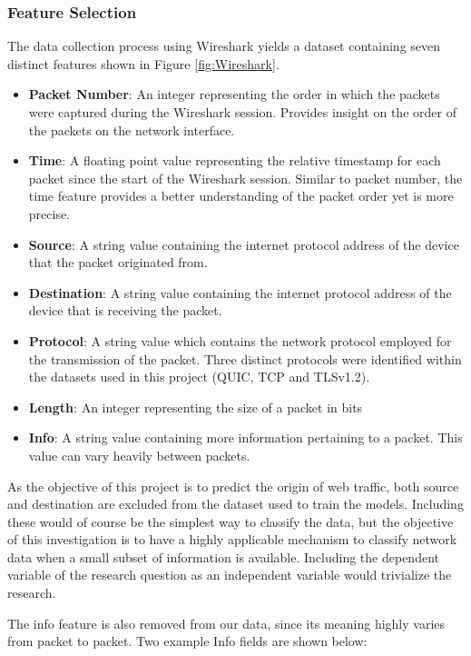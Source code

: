 \documentclass[10pt,sigconf,letterpaper,nonacm]{acmart}
\begin{document}
\subsubsection{Feature Selection}
The data collection process using Wireshark yields a dataset containing seven distinct features shown in Figure \ref{fig:Wireshark}. 
\begin{itemize}
  \item \textbf{Packet Number}: An integer representing the order in which the packets were captured during the Wireshark session. Provides insight on the order of the packets on the network interface. 
  \item \textbf{Time}: A floating point value representing the relative timestamp for each packet since the start of the Wireshark session. Similar to packet number, the time feature provides a better understanding of the packet order yet is more precise.
  \item \textbf{Source}: A string value containing the internet protocol address of the device that the packet originated from. 
  \item \textbf{Destination}: A string value containing the internet protocol address of the device that is receiving the packet. 
  \item \textbf{Protocol}: A string value which contains the network protocol employed for the transmission of the packet. Three distinct protocols were identified within the datasets used in this project (QUIC, TCP and TLSv1.2).
  \item \textbf{Length}: An integer representing the size of a packet in bits 
  \item \textbf{Info}: A string value containing more information pertaining to a packet. This value can vary heavily between packets.
\end{itemize} 
As the objective of this project is to predict the origin of web traffic, both source and destination are excluded from the dataset used to train the models. 
Including these would of course be the simplest way to classify the data, but the objective of this investigation is to have a highly applicable mechanism to classify network data when a small subset of information is available. 
Including the dependent variable of the research question as an independent variable would trivialize the research.

The info feature is also removed from our data, since its meaning highly varies from packet to packet. Two example Info fields are shown below:
\end{document}
